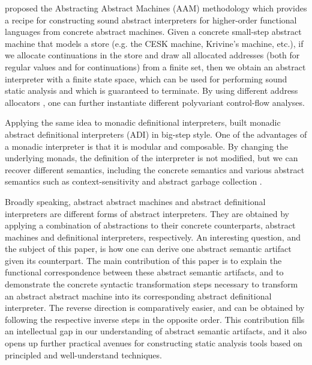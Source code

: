 \documentclass[acmsmall, review]{acmart}\settopmatter{}
\begin{document}
 proposed the Abstracting Abstract Machines (AAM)
methodology which provides a recipe for constructing sound abstract interpreters
for higher-order functional languages from concrete abstract machines.
Given a concrete small-step abstract machine that models a store 
(e.g. the CESK machine, Krivine's machine, etc.), if we allocate continuations 
in the store and draw all allocated addresses (both for regular values and 
for continuations) from a finite set, then
we obtain an abstract interpreter with a finite state space, which can be used for 
performing sound static analysis and which is guaranteed to terminate.
By using different address allocators \cite{Gilray:2016:ACP:2951913.2951936},
one can further instantiate different polyvariant control-flow analyses.

Applying the same idea to monadic definitional interpreters, \citet{darais2017abstracting}
built monadic abstract definitional interpreters (ADI) in big-step style. 
One of the advantages of a monadic interpreter is
that it is modular and composable. By changing the underlying monads, the definition
of the interpreter is not modified, but we can recover different semantics, including
the concrete semantics and various abstract semantics such as context-sensitivity and
abstract garbage collection \cite{Sergey:2013:MAI:2491956.2491979}.

Broadly speaking, abstract abstract machines and abstract definitional interpreters are
different forms of abstract interpreters. They are obtained by applying a combination
of abstractions to their concrete counterparts, abstract machines and definitional
interpreters, respectively. An interesting question, and the subject of this paper, is
how one can derive one abstract semantic artifact given its counterpart.
The main contribution of this paper is to explain the functional correspondence
between these abstract semantic artifacts, and to demonstrate the concrete
syntactic transformation steps necessary to transform an abstract abstract machine 
into its corresponding abstract definitional interpreter. The reverse direction
is comparatively easier, and can be obtained by following the respective inverse 
steps in the opposite order. This contribution fills an intellectual gap in our 
understanding of abstract semantic artifacts, and it also opens up further practical 
avenues for constructing static analysis tools based on principled and well-understand
techniques.
\end{document}
